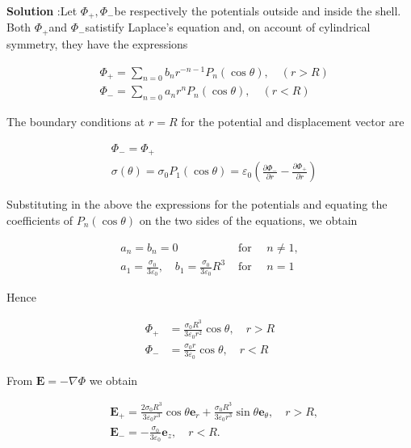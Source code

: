 \documentclass[10pt]{article}
\begin{document}
\textbf{Solution} :Let $\Phi_{+}, \Phi_{-}$be respectively the potentials outside and inside the shell. Both $\Phi_{+}$and $\Phi_{-}$satistify Laplace's equation and, on account of cylindrical symmetry, they have the expressions

$$
\begin{aligned}
&\Phi_{+}=\sum_{n=0} b_{n} r^{-n-1} P_{n}(\cos \theta), \quad(r>R) \\
&\Phi_{-}=\sum_{n=0} a_{n} r^{n} P_{n}(\cos \theta), \quad(r<R)
\end{aligned}
$$

The boundary conditions at $r=R$ for the potential and displacement vector are

$$
\begin{aligned}
&\Phi_{-}=\Phi_{+} \\
&\sigma(\theta)=\sigma_{0} P_{1}(\cos \theta)=\varepsilon_{0}\left(\frac{\partial \Phi_{-}}{\partial r}-\frac{\partial \Phi_{+}}{\partial r}\right)
\end{aligned}
$$

Substituting in the above the expressions for the potentials and equating the coefficients of $P_{n}(\cos \theta)$ on the two sides of the equations, we obtain

$$
\begin{array}{ll}
a_{n}=b_{n}=0 & \text { for } \quad n \neq 1, \\
a_{1}=\frac{\sigma_{0}}{3 \varepsilon_{0}}, \quad b_{1}=\frac{\sigma_{0}}{3 \varepsilon_{0}} R^{3} & \text { for } \quad n=1
\end{array}
$$

Hence

$$
\begin{aligned}
\Phi_{+} &=\frac{\sigma_{0} R^{3}}{3 \varepsilon_{0} r^{2}} \cos \theta, \quad r>R \\
\Phi_{-} &=\frac{\sigma_{0} r}{3 \varepsilon_{0}} \cos \theta, \quad r<R
\end{aligned}
$$

From $\mathbf{E}=-\nabla \Phi$ we obtain

$$
\begin{aligned}
&\mathbf{E}_{+}=\frac{2 \sigma_{0} R^{3}}{3 \varepsilon_{0} r^{3}} \cos \theta \mathbf{e}_{r}+\frac{\sigma_{0} R^{3}}{3 \varepsilon_{0} r^{3}} \sin \theta \mathbf{e}_{\theta}, \quad r>R, \\
&\mathbf{E}_{-}=-\frac{\sigma_{0}}{3 \varepsilon_{0}} \mathbf{e}_{z}, \quad r<R .
\end{aligned}
$$
\end{document}
